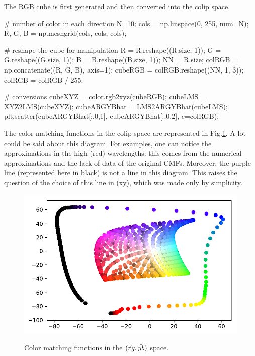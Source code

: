 The RGB cube is first generated and then converted into the colip space.
\begin{python}
# number of color in each direction
N=10;
cols = np.linspace(0, 255, num=N);
R, G, B = np.meshgrid(cols, cols, cols);

# reshape the cube for manipulation
R = R.reshape((R.size, 1));
G = G.reshape((G.size, 1));
B = B.reshape((B.size, 1));
NN  = R.size;
colRGB = np.concatenate((R, G, B), axis=1);
cubeRGB = colRGB.reshape((NN, 1, 3));
colRGB = colRGB / 255;

# conversions
cubeXYZ = color.rgb2xyz(cubeRGB);
cubeLMS = XYZ2LMS(cubeXYZ);
cubeARGYBhat = LMS2ARGYBhat(cubeLMS);
plt.scatter(cubeARGYBhat[:,0,1], cubeARGYBhat[:,0,2], c=colRGB);
\end{python}

The color matching functions in the colip space are represented in Fig.\ref{fig:colip:python:rgyb}. A lot could be said about this diagram. For examples, one can notice the approximations in the high (red) wavelengths: this comes from the numerical approximations and the lack of data of the original CMFs. Moreover, the purple line (represented here in black) is not a line in this diagram. This raises the question of the choice of this line in (xy), which was made only by simplicity.

\begin{figure}[htbp]
	\centering\caption{Color matching functions in the $(\mathop{\hat{rg}}\nolimits,\mathop{\hat{yb}}\nolimits)$ space.}%
	\includegraphics[width=.8\linewidth]{argyb.python.pdf}%
	\label{fig:colip:python:rgyb}%
\end{figure}
